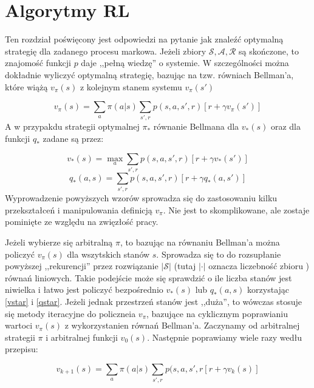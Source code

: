 \documentclass[licencjacka]{pracamgr}
\begin{document}
\section{Algorytmy RL}

Ten rozdział poświęcony jest odpowiedzi na pytanie jak znaleźć optymalną strategię dla zadanego procesu markowa. Jeżeli zbiory  $\mathcal{S}, \mathcal{A}, \mathcal{R}$ są skończone, to znajomość funkcji $p$ daje ,,pełną wiedzę'' o systemie. W szczególności można dokładnie wyliczyć optymalną strategię, bazując na tzw. równiach Bellman'a, które wiążą $v_{\pi}(s)$ z kolejnym stanem systemu $v_{\pi}(s')$

\begin{equation}
	v_{\pi}(s) = \sum_{a}\pi(a|s)\sum_{s',r}p(s,a,s',r)[r +\gamma v_{\pi}(s')] 
\end{equation}
A w przypakdu strategii optymalnej $\pi_{*}$ równanie Bellmana dla $v_{*}(s)$ oraz dla funkcji $q_{*}$ zadane są przez:

\begin{equation}\label{vstar}
	v_{*}(s) = \max_{a}\sum_{s',r}p(s,a,s',r)[r +\gamma v_{*}(s')]
\end{equation}
\begin{equation}\label{qstar}
	q_{*}(a, s) = \sum_{s',r}p(s,a,s',r)[r +\gamma q_{*}(a,s')]
\end{equation}
Wyprowadzenie powyższych wzorów sprowadza się do zastosowaniu kilku przekształceń i manipulowania definicją $v_{\pi}$. Nie jest to skomplikowane, ale zostaje pominięte ze względu na zwięzłość pracy. 

Jeżeli wybierze się arbitralną  $\pi$, to bazując na równaniu Bellman'a można policzyć $v_{\pi}(s)$ dla wszytskich stanów $s$. Sprowadza się to do rozsupłanie powyższej ,,rekurencji''  przez rozwiązanie 
$|\mathcal{S}|$  (tutaj $|\cdot|$ oznacza liczebność zbioru ) równań liniowych. Takie podejście może się sprawdzić o ile liczba stanów jest niwielka i łatwo jest policzyć bezpośrednio $v_{*}(s)$ lub $q_{*}(a,s)$ korzystając \ref{vstar} i \ref{qstar}.  Jeżeli jednak przestrzeń stanów jest ,,duża'', to  wówczas stosuje się metody iteracyjne do policzneia $v_{\pi}$, bazujące na cyklicznym poprawianiu wartoci $v_{\pi}(s)$ z wykorzystanien równań Bellman'a. Zaczynamy od arbitralnej strategii $\pi$ i arbitralnej funkcji $v_{0}(s)$. Następnie poprawiamy wiele razy wedłu przepisu:

\begin{equation}\label{GPI}
	v_{k+1}(s) = \sum_{a}\pi(a|s)\sum_{s',r}p(s,a,s',r[r+\gamma v_{k}(s)]
\end{equation}
\end{document}
